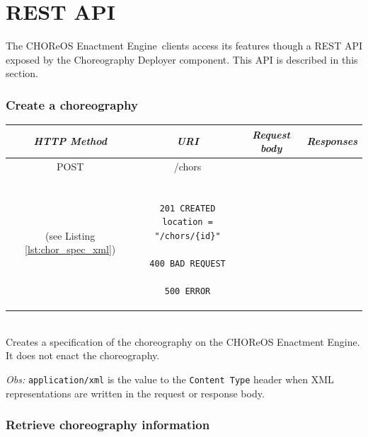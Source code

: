 \documentclass[a4paper, 10pt]{article}
\newcommand{\ee}{CHOReOS Enactment Engine}
\begin{document}
\section{REST API}
\label{sec:api}

The \ee\ clients access its features though a REST API exposed by the Choreography Deployer component. This API is described in this section.

\subsubsection*{Create a choreography}

\begin{tabular}{|c|c|c|c|}
\hline 
\itshape{HTTP Method} & \itshape{URI} & \itshape{Request body} & \itshape{Responses} \\ 
\hline 
POST & /chors & 

\begin{minipage}{2in}
\verb!ChorSpec! XML representation \\ 
(see Listing \ref{lst:chor_spec_xml})
\end{minipage} 
&

\begin{minipage}{2in}
\begin{verbatim}

201 CREATED
location = "/chors/{id}"

400 BAD REQUEST

500 ERROR

\end{verbatim}
\end{minipage} 
\\ 
\hline 
\end{tabular} \\

Creates a specification of the choreography on the \ee.
It does not enact the choreography. 

\emph{Obs:} \texttt{application/xml} is the value to the \texttt{Content Type} header when XML representations are written in the request or response body. 

\subsubsection*{Retrieve choreography information}
\end{document}
